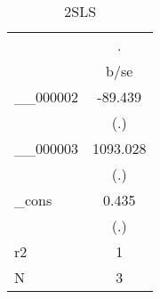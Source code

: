 \begin{table}[htbp]\centering
\def\sym#1{\ifmmode^{#1}\else\(^{#1}\)\fi}
\caption{2SLS\label{tab1}}
\begin{tabular}{l*{1}{c}}
\toprule
            &           .   \\
            &        b/se   \\
\midrule
\_\_000002    &     -89.439   \\
            &         (.)   \\
\_\_000003    &    1093.028   \\
            &         (.)   \\
\_cons      &       0.435   \\
            &         (.)   \\
\midrule
r2          &           1   \\
N           &           3   \\
\bottomrule
\end{tabular}
\end{table}
